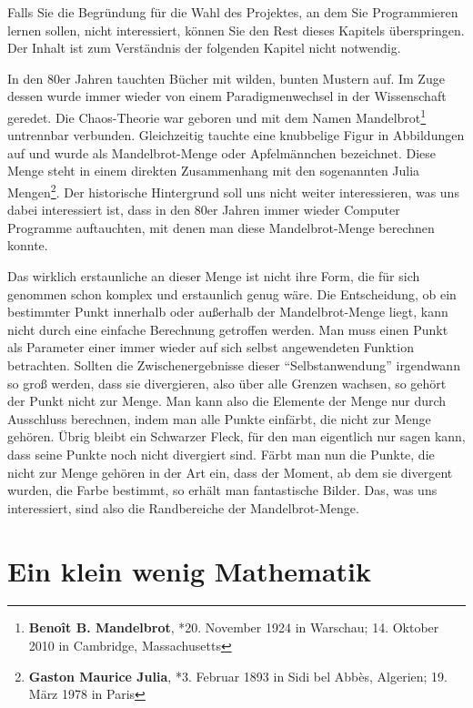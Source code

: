 Falls Sie die Begründung für die Wahl des Projektes, an dem Sie Programmieren lernen sollen, nicht interessiert, können Sie den Rest dieses Kapitels überspringen. Der Inhalt ist zum Verständnis der folgenden Kapitel nicht notwendig. 

In den 80er Jahren tauchten Bücher mit wilden, bunten Mustern auf. Im Zuge dessen wurde immer wieder von einem Paradigmenwechsel in der Wissenschaft geredet. Die Chaos-Theorie war geboren und mit dem Namen Mandelbrot\footnote{\textbf{Benoît B. Mandelbrot}, *20. November 1924 in Warschau; 14. Oktober 2010 in Cambridge, Massachusetts} untrennbar verbunden. Gleichzeitig tauchte eine knubbelige Figur in Abbildungen auf und wurde als Mandelbrot-Menge oder Apfelmännchen bezeichnet. Diese Menge steht in einem direkten Zusammenhang mit den sogenannten Julia Mengen\footnote{\textbf{Gaston Maurice Julia}, *3. Februar 1893 in Sidi bel Abbès, Algerien; 19. März 1978 in Paris}. Der historische Hintergrund soll uns nicht weiter interessieren, was uns dabei interessiert ist, dass in den 80er Jahren immer wieder Computer Programme auftauchten, mit denen man diese Mandelbrot-Menge berechnen konnte. 

Das wirklich erstaunliche an dieser Menge ist nicht ihre Form, die für sich genommen schon komplex und erstaunlich genug wäre. Die Entscheidung, ob ein bestimmter Punkt innerhalb oder außerhalb der Mandelbrot-Menge liegt, kann nicht durch eine einfache Berechnung getroffen werden. Man muss einen Punkt als Parameter einer immer wieder auf sich selbst angewendeten Funktion betrachten. Sollten die Zwischenergebnisse dieser "`Selbstanwendung"' irgendwann so groß werden, dass sie divergieren, also über alle Grenzen wachsen, so gehört der Punkt nicht zur Menge. Man kann also die Elemente der Menge nur durch Ausschluss berechnen, indem man alle Punkte einfärbt, die nicht zur Menge gehören. Übrig bleibt ein Schwarzer Fleck, für den man eigentlich nur sagen kann, dass seine Punkte noch nicht divergiert sind. Färbt man nun die Punkte, die nicht zur Menge gehören in der Art ein, dass der Moment, ab dem sie divergent wurden, die Farbe bestimmt, so erhält man fantastische Bilder. Das, was uns interessiert, sind also die Randbereiche der Mandelbrot-Menge. 

\section{Ein klein wenig Mathematik}


